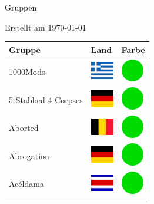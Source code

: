 \documentclass[12pt, a4paper, twoside]{report}
\begin{document}
	
	\begin{center}
		\vspace{1cm}
		{\Large Gruppen\par}
		
		{\large Erstellt am \today\par}
	\end{center}
	
	\begin{center}
		\begin{longtable}{|p{5cm}|p{2cm}|p{2cm}|} 
			
			\hline
			\rowcolor{lightgray} Gruppe & Land & Farbe \\ \hline
			\endhead
1000Mods & \includegraphics[width=1cm]{4x3/gr} & \includegraphics[width=1cm]{likes/y} \\ \hline
5 Stabbed 4 Corpses & \includegraphics[width=1cm]{4x3/de} & \includegraphics[width=1cm]{likes/y} \\ \hline
Aborted & \includegraphics[width=1cm]{4x3/be} & \includegraphics[width=1cm]{likes/y} \\ \hline
Abrogation & \includegraphics[width=1cm]{4x3/de} & \includegraphics[width=1cm]{likes/y} \\ \hline
Acéldama & \includegraphics[width=1cm]{4x3/cr} & \includegraphics[width=1cm]{likes/y} \\ \hline

\end{longtable}
\end{center}
\end{document}
